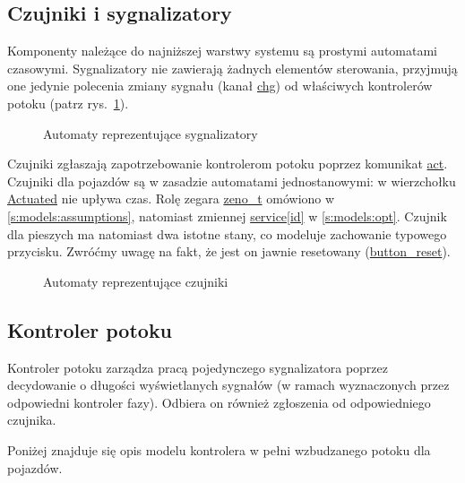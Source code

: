 \documentclass{pracamgr}
\newcommand{\imgr}[1]{rys.~\ref{#1}}
\theoremstyle{plain}
\begin{document}
\subsection{Czujniki i sygnalizatory}
\label{ss:models:models:dets}
Komponenty należące do najniższej warstwy systemu są prostymi
automatami czasowymi.
Sygnalizatory nie zawierają żadnych elementów sterowania, przyjmują
one jedynie polecenia zmiany sygnału (kanał \url{chg}) od właściwych
kontrolerów potoku (patrz \imgr{img:lights}).

\begin{figure}
  \centering
  \hspace{1cm}
  \caption{Automaty reprezentujące sygnalizatory}
  \label{img:lights}
\end{figure}

Czujniki zgłaszają zapotrzebowanie kontrolerom potoku poprzez
komunikat \url{act}. Czujniki dla pojazdów są w zasadzie automatami
jednostanowymi: w wierzchołku \url{Actuated} nie upływa czas. Rolę
zegara \url{zeno_t} omówiono w \ref{s:models:assumptions}, natomiast
zmiennej \url{service[id]} w \ref{s:models:opt}. Czujnik dla pieszych
ma natomiast dwa istotne stany, co modeluje zachowanie typowego
przycisku. Zwróćmy uwagę na fakt, że jest on jawnie resetowany
(\url{button_reset}).

\begin{figure}
  \centering
  \hspace{1cm}
  \caption{Automaty reprezentujące czujniki}
  \label{img:detectors}
\end{figure}

\subsection{Kontroler potoku}
Kontroler potoku zarządza pracą pojedynczego sygnalizatora poprzez
decydowanie o długości wyświetlanych sygnałów (w ramach wyznaczonych
przez odpowiedni kontroler fazy). Odbiera on również zgłoszenia od
odpowiedniego czujnika.

Poniżej znajduje się opis modelu kontrolera w pełni wzbudzanego potoku
dla pojazdów.
\end{document}
